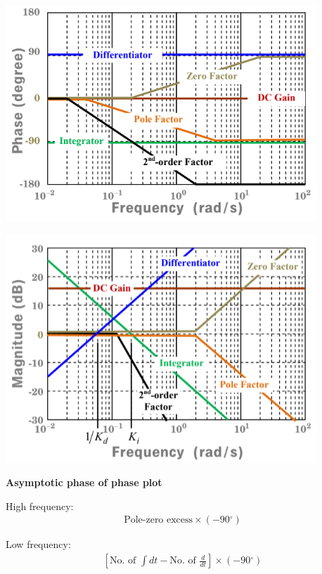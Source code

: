 \documentclass[landscape,a4paper]{extarticle}
\newenvironment{Figure}
  {\noindent\minipage{\linewidth}}
  {\endminipage\par\medskip}
\newcommand{\degree}{\ensuremath{^\circ}}
\begin{document}
\begin{multicols*}{5}
    \begin{Figure}
        \centering
        \includegraphics[width=\linewidth]{bode1.png}        
    \end{Figure}
    \begin{Figure}
        \centering
        \includegraphics[width=\linewidth]{bode2.png}        
    \end{Figure}

    \newcolumn
    \textbf{Asymptotic phase of phase plot}

    High frequency:
    \begin{align*}
        \text{Pole-zero excess} \times (-90 \degree) \tag{8.4a}
    \end{align*}

    Low frequency:
    \begin{align*}
        \left[\text{No. of }\int dt - \text{No. of } \frac{d}{dt}\right] \times (-90 \degree) \tag{8.4b}
    \end{align*}


\end{multicols*}
\end{document}
